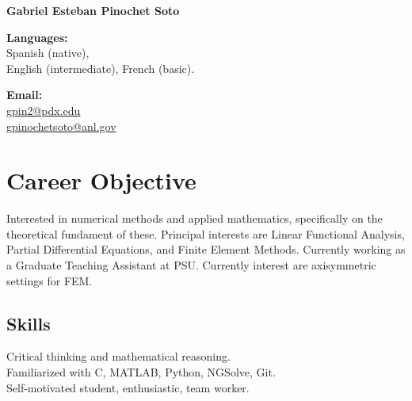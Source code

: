 \documentclass[12pt,letterpaper]{report}
\newcommand{\myname}{Gabriel Esteban Pinochet Soto}
\newcommand{\namefont}[1]{{\normalfont\bfseries\Huge{#1}}}
\begin{document}
    \raggedright{}

    \namefont{\myname}

    \vspace{1em}
    \begin{minipage}[t]{0.4\textwidth}
        {\bf Languages:}\\ Spanish (native), \\English (intermediate), French (basic). \\
    \end{minipage}
    \begin{minipage}[t]{0.4\textwidth}
        {\bf Email:}\\
        \href{mailto:gpin2@pdx.edu}{gpin2@pdx.edu}\\
        \href{mailto:gpinochetsoto@anl.gov}{gpinochetsoto@anl.gov}\\
    \end{minipage}
    \hfill

    \section*{Career Objective}

    Interested in numerical methods and applied mathematics, specifically on the theoretical fundament of these.
    Principal interests are Linear Functional Analysis, Partial Differential Equations, and Finite Element Methods.
    Currently working as a Graduate Teaching Assistant at PSU.
    Currently interest are axisymmetric settings for FEM.

    \subsection*{Skills}

    Critical thinking and mathematical reasoning.\\
    Familiarized with C, MATLAB, Python, NGSolve, Git.\\
    Self-motivated student, enthusiastic, team worker.

\end{document}
